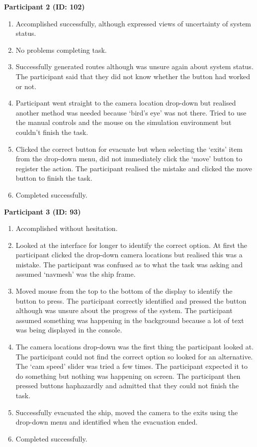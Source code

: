 \textbf{Participant 2 (ID: 102)}
\begin{enumerate}
\item Accomplished successfully, although expressed views of uncertainty of system status.
\item No problems completing task.
\item Successfully generated routes although was unsure again about system status. The participant said that they did not know whether the button had worked or not.
\item Participant went straight to the camera location drop-down but realised another method was needed because ‘bird’s eye’ was not there. Tried to use the manual controls and the mouse on the simulation environment but couldn’t finish the task.
\item Clicked the correct button for evacuate but when selecting the ‘exits’ item from the drop-down menu, did not immediately click the ‘move’ button to register the action. The participant realised the mistake and clicked the move button to finish the task.
\item Completed successfully.
\end{enumerate}

\textbf{Participant 3 (ID: 93)}
\begin{enumerate}
\item Accomplished without hesitation.
\item Looked at the interface for longer to identify the correct option. At first the participant clicked the drop-down camera locations but realised this was a mistake. The participant was confused as to what the task was asking and assumed ‘navmesh’ was the ship frame.
\item Moved mouse from the top to the bottom of the display to identify the button to press. The participant correctly identified and pressed the button although was unsure about the progress of the system. The participant assumed something was happening in the background because a lot of text was being displayed in the console.
\item The camera locations drop-down was the first thing the participant looked at. The participant could not find the correct option so looked for an alternative. The ‘cam speed’ slider was tried a few times. The participant expected it to do something but nothing was happening on screen. The participant then pressed buttons haphazardly and admitted that they could not finish the task.
\item Successfully evacuated the ship, moved the camera to the exits using the drop-down menu and identified when the evacuation ended.
\item Completed successfully.
\end{enumerate}

